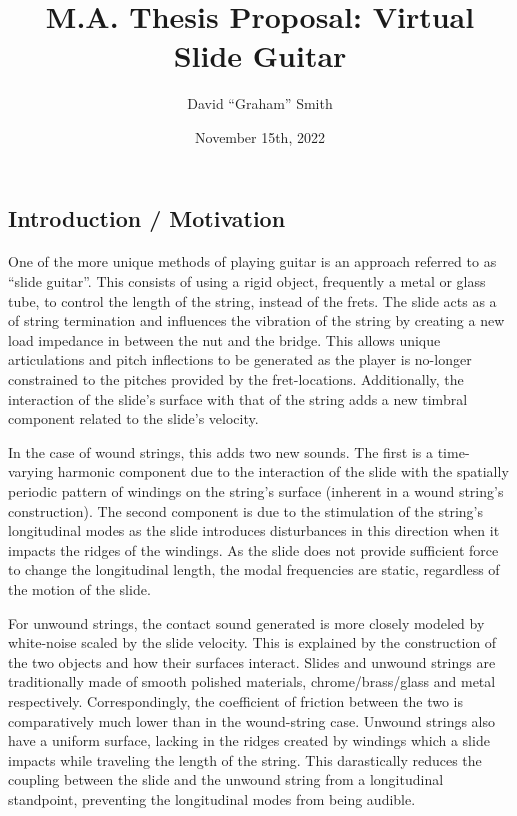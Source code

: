 \documentclass[12pt]{article}
\title{\Large{M.A. Thesis Proposal: Virtual Slide Guitar}}
\author{David ``Graham'' Smith}
\date{November 15th, 2022}
\begin{document}
\maketitle

\subsection*{Introduction / Motivation}
\paragraph{}
One of the more unique methods of playing guitar is an approach referred to as “slide guitar”. This consists of using a rigid object, frequently a metal or glass tube, to control the length of the string, instead of the frets. The slide acts as a of string termination and influences the vibration of the string by creating a new load impedance in between the nut and the bridge. This allows unique articulations and pitch inflections to be generated as the player is no-longer constrained to the pitches provided by the fret-locations. Additionally, the interaction of the slide’s surface with that of the string adds a new timbral component related to the slide’s velocity. 

In the case of wound strings, this adds two new sounds. The first is a time-varying harmonic component due to the interaction of the slide with the spatially periodic pattern of windings on the string’s surface (inherent in a wound string’s construction).  The second component is due to the stimulation of the string’s longitudinal modes as the slide introduces disturbances in this direction when it impacts the ridges of the windings. As the slide does not provide sufficient force to change the longitudinal length, the modal frequencies are static, regardless of the motion of the slide. 

For unwound strings, the contact sound generated is more closely modeled by white-noise scaled by the slide velocity. This is explained by the construction of the two objects and how their surfaces interact. Slides and unwound strings are traditionally made of smooth polished materials, chrome/brass/glass and metal respectively. Correspondingly, the coefficient of friction between the two is comparatively much lower than in the wound-string case. Unwound strings also have a uniform surface, lacking in the ridges created by windings which a slide impacts while traveling the length of the string. This darastically reduces the coupling between the slide and the unwound string from a longitudinal standpoint, preventing the longitudinal modes from being audible.
\end{document}

